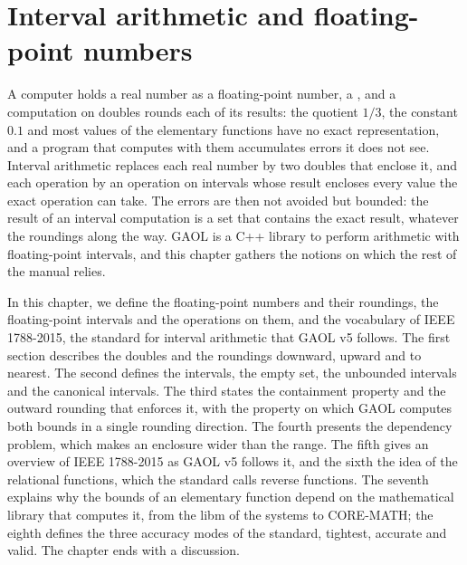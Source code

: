 \chapter{Interval arithmetic and floating-point numbers}\label{chap:concepts}
%

A computer holds a real number as a floating-point number, a ,
and a computation on doubles rounds each of its results: the quotient $1/3$,
the constant $0.1$ and most values of the elementary functions have no exact
representation, and a program that computes with them accumulates errors it
does not see. Interval arithmetic replaces each real number by two doubles
that enclose it, and each operation by an operation on intervals whose
result encloses every value the exact operation can take. The errors are
then not avoided but bounded: the result of an interval computation is a set
that contains the exact result, whatever the roundings along the way. GAOL
is a C++ library to perform arithmetic with floating-point intervals, and
this chapter gathers the notions on which the rest of the manual relies.

\medskip
In this chapter, we define the floating-point numbers and their roundings,
the floating-point intervals and the operations on them, and the vocabulary
of IEEE 1788-2015, the standard for interval arithmetic that GAOL v5
follows. The first section describes the doubles and the roundings
downward, upward and to nearest. The second defines the intervals, the
empty set, the unbounded intervals and the canonical intervals. The third
states the containment property and the outward rounding that enforces it,
with the property on which GAOL computes both bounds in a single rounding
direction. The fourth presents the dependency problem, which makes an
enclosure wider than the range. The fifth gives an overview of IEEE
1788-2015 as GAOL v5 follows it, and the sixth the idea of the relational
functions, which the standard calls reverse functions. The seventh explains
why the bounds of an elementary function depend on the mathematical library
that computes it, from the libm of the systems to CORE-MATH; the eighth
defines the three accuracy modes of the standard, tightest, accurate and
valid. The chapter ends with a discussion.

